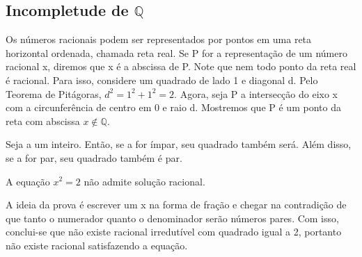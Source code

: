 \documentclass[analysis_notes.tex]{subfiles}
\begin{document}
\subsection{Incompletude de $\mathbb{Q}$}
Os n\'umeros racionais podem ser representados por pontos em uma reta horizontal ordenada, chamada reta real. Se P for a representa\c c\~ao
de um n\'umero racional x, diremos que x \'e a abscissa de P. Note que nem todo ponto da reta real \'e racional. Para isso, considere
um quadrado de lado 1 e diagonal d. Pelo Teorema de Pit\'agoras, $d^{2} = 1^2 + 1^2 = 2.$ Agora, seja P a intersec\c c\~ao do eixo
x com a circunfer\^encia de centro em 0 e raio d. Mostremos que P \'e um ponto da reta com abscissa $x\not\in \mathbb{Q}.$
\begin{prop*}
	Seja a um inteiro. Ent\~ao, se a for \'impar, seu quadrado tamb\'em ser\'a. Al\'em disso, se a for par, seu quadrado tamb\'em \'e par.
\end{prop*}
\begin{prop*}
	A equa\c c\~ao $x^2 = 2$ n\~ao admite solu\c c\~ao racional.
\end{prop*}
A ideia da prova \'e escrever um x na forma de fra\c c\~ao e chegar na contradi\c c\~ao de que tanto o numerador quanto o denominador
ser\~ao n\'umeros pares. Com isso, conclui-se que n\~ao existe racional irredut\'ivel com quadrado igual a 2, portanto n\~ao existe racional
satisfazendo a equa\c c\~ao.
\end{document}
